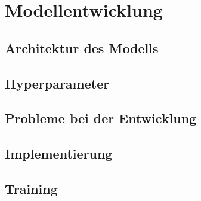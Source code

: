 \section{Modellentwicklung}
\subsection{Architektur des Modells}
\subsection{Hyperparameter}
\subsection{Probleme bei der Entwicklung}
\subsection{Implementierung}
\subsection{Training}
